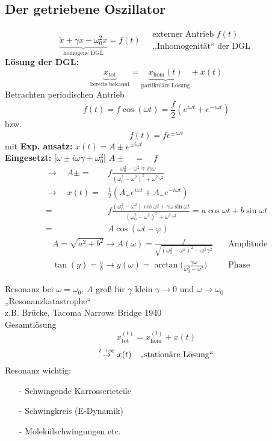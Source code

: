 \documentclass[titlepage,12pt,a4paper,ngerman]{report}
\newcommand{\tx}[1]{\textrm{#1}}
\begin{document}
\subsection{Der getriebene Oszillator}
$$\underbrace{\ddot{x} + \gamma \dot{x} - \omega^2_0 x}_{\textrm{homogene DGL}} = f(t) \quad \substack{\textrm{externer Antrieb } f(t) \\ \textrm{,,Inhomogenität`` der DGL}}$$
\textbf{Lösung der DGL:}
$$\underbrace{x_{\tx{tot}}}_{\textrm{bereits bekannt}} = \underbrace{x_{\tx{hom}}(t)}_{\textrm{partikuläre Lösung}} + x (t)$$
Betrachten periodischen Antrieb
$$f (t) = f \cos(\omega t) = \frac{f}{2} ( e^{i \omega t} + e^{-i \omega t})$$
bzw.
$$f(t) = fe^{\pm i \omega t}$$
mit \textbf{Exp. ansatz:} $x(t) = A \pm e^{\pm i \omega t}$\\
\textbf{Eingesetzt:} [$\omega \pm i \omega \gamma + \omega_0^2$] $A \pm \quad = \quad f$ 
\begin{align*}
\rightarrow \quad A \pm =& f \frac{\omega^2_0 - \omega^2 \mp i \gamma \omega}{(\omega_0^2 - \omega^2)^2 + \omega^2 \gamma^2}\\[10pt]
\rightarrow \quad x(t) =& \frac{1}{2}(A_+e^{i \omega t}+A_- e^{-i \omega t})\\[10pt] 
=& f\frac{(\omega_0^2 - \omega^2) \cos \omega t + \gamma \omega \sin \omega t}{(\omega_0^2 - \omega^2)^2 + \omega^2 \gamma^2} = a \cos \omega t + b \sin \omega t\\[10pt]
=& A \cos (\omega t - \varphi)
\end{align*}
\begin{align*}
&A = \sqrt{a^2 +b^2} \rightarrow A(\omega) = \frac{f}{\sqrt{(\omega^2_0 - \omega^2)^2 - \omega^2 \gamma^2}} \quad &\textrm{Amplitude}\\[15pt]
&\tan(y) = \frac{a}{b} \rightarrow y(\omega) = \arctan\bigg(\frac{\gamma \omega}{\omega^2_0 - \omega^2}\bigg ) \quad &\textrm{Phase}
\end{align*}


Resonanz bei $\omega = \omega_0$, $A$ groß für $\gamma$ klein
$\gamma \to 0$ und $\omega \to \omega_0$ 	„Resonanzkatastrophe“\\
z.B. Brücke, Tacoma Narrows Bridge 1940\\
Gesamtlösung $$x_{\tx{tot}}^{(t)} = x_{\tx{hom}}^{(t)} + x (t)$$
$$\buildrel{t \to \infty}\over{\rightarrow} x(t) \quad \textrm{,,stationäre Lösung``} $$
Resonanz wichtig: \begin{itemize}
	\item[-] Schwingende Karrosserieteile
	\item[-] Schwingkreis (E-Dynamik)
	\item[-] Molekülschwingungen etc.
\end{itemize}
\end{document}
